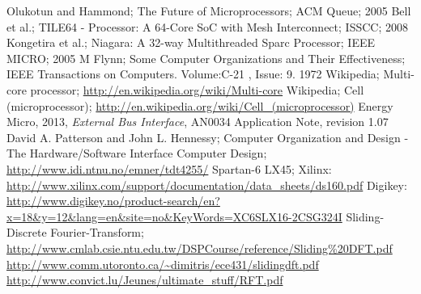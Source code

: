 \clearpage{}
\begin{thebibliography}{1}

 Olukotun and Hammond; The Future of Microprocessors; ACM
Queue; 2005
 Bell et al.; TILE64 - Processor: A 64-Core SoC with Mesh
Interconnect; ISSCC; 2008
 Kongetira et al.; Niagara: A 32-way Multithreaded Sparc
Processor; IEEE MICRO; 2005
 M Flynn; Some Computer Organizations and Their Effectiveness;
IEEE Transactions on Computers. Volume:C-21 , Issue: 9. 1972
 Wikipedia; Multi-core processor;\newline
\url{http://en.wikipedia.org/wiki/Multi-core}
 Wikipedia; Cell (microprocessor);\newline
\url{http://en.wikipedia.org/wiki/Cell_(microprocessor)}
	Energy Micro, 2013,\newline
	\textsl{External Bus Interface}, AN0034 Application Note, revision 1.07
 David A. Patterson and John L. Hennessy; Computer
	Organization and Design - The Hardware/Software Interface
 Computer Design;\newline
	\url{http://www.idi.ntnu.no/emner/tdt4255/}
 Spartan-6 LX45; \newline
	Xilinx: \url{http://www.xilinx.com/support/documentation/data_sheets/ds160.pdf}
	\newline
	Digikey: \url{
	http://www.digikey.no/product-search/en?x=18&y=12&lang=en&site=no&KeyWords=XC6SLX16-2CSG324I}
 Sliding-Discrete Fourier-Transform;\newline
	\url{http://www.cmlab.csie.ntu.edu.tw/DSPCourse/reference/Sliding%20DFT.pdf}
	\newline
	\url{http://www.comm.utoronto.ca/~dimitris/ece431/slidingdft.pdf}
	\newline
	\url{http://www.convict.lu/Jeunes/ultimate_stuff/RFT.pdf}

\end{thebibliography}

